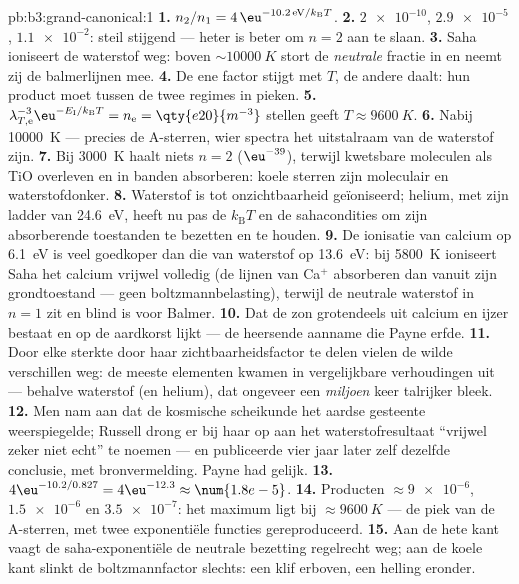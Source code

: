 \begin{solution}{pb:b3:grand-canonical:1}
\textbf{1.} $n_2/n_1 = 4\,\eu^{-10.2\,\text{eV}/k_{\text{B}}T}$.
\textbf{2.} $\num{2e-10}$, $\num{2.9e-5}$, $\num{1.1e-2}$: steil
stijgend --- heter is beter om $n = 2$ aan te slaan.
\textbf{3.} Saha ioniseert de waterstof weg: boven $\sim\qty{10000}{K}$
stort de \emph{neutrale} fractie in en neemt zij de balmerlijnen mee.
\textbf{4.} De ene factor stijgt met $T$, de andere daalt: hun product moet
tussen de twee regimes in pieken.
\textbf{5.} $\lambda_{T,\text{e}}^{-3}\eu^{-E_{\text{I}}/
k_{\text{B}}T} = n_{\text{e}} = \qty{e20}{m^{-3}}$ stellen geeft $T
\approx \qty{9600}{K}$.
\textbf{6.} Nabij \qty{10000}{K} --- precies de A-sterren, wier spectra het
uitstalraam van de waterstof zijn.
\textbf{7.} Bij \qty{3000}{K} haalt niets $n = 2$ ($\eu^{-39}$), terwijl
kwetsbare moleculen als TiO overleven en in banden absorberen: koele
sterren zijn moleculair en waterstofdonker.
\textbf{8.} Waterstof is tot onzichtbaarheid geïoniseerd; helium, met zijn
ladder van \qty{24.6}{eV}, heeft nu pas de $k_{\text{B}}T$ en de
sahacondities om zijn absorberende toestanden te bezetten en te houden.
\textbf{9.} De ionisatie van calcium op \qty{6.1}{eV} is veel goedkoper
dan die van waterstof op \qty{13.6}{eV}: bij \qty{5800}{K} ioniseert Saha
het calcium vrijwel volledig (de lijnen van Ca$^+$ absorberen dan vanuit
zijn grondtoestand --- geen boltzmannbelasting), terwijl de neutrale
waterstof in $n = 1$ zit en blind is voor Balmer.
\textbf{10.} Dat de zon grotendeels uit calcium en ijzer bestaat en op de
aardkorst lijkt --- de heersende aanname die Payne erfde.
\textbf{11.} Door elke sterkte door haar zichtbaarheidsfactor te delen
vielen de wilde verschillen weg: de meeste elementen kwamen in
vergelijkbare verhoudingen uit --- behalve waterstof (en helium), dat
ongeveer een \emph{miljoen} keer talrijker bleek.
\textbf{12.} Men nam aan dat de kosmische scheikunde het aardse gesteente
weerspiegelde; Russell drong er bij haar op aan het waterstofresultaat
``vrijwel zeker niet echt'' te noemen --- en publiceerde vier jaar later
zelf dezelfde conclusie, met bronvermelding. Payne had gelijk.
\textbf{13.} $4\eu^{-10.2/0.827} = 4\eu^{-12.3} \approx
\num{1.8e-5}$.
\textbf{14.} Producten $\approx \num{9e-6}$, $\num{1.5e-6}$ en
$\num{3.5e-7}$: het maximum ligt bij $\approx\qty{9600}{K}$ --- de piek van
de A-sterren, met twee exponentiële functies gereproduceerd.
\textbf{15.} Aan de hete kant vaagt de saha-exponentiële de neutrale
bezetting regelrecht weg; aan de koele kant slinkt de boltzmannfactor
slechts: een klif erboven, een helling eronder.

\end{solution}
